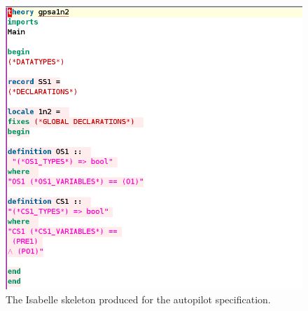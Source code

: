 \begin{figure}[H]
\centering
\begin{minipage}{0.45\textwidth}
\centering
\includegraphics[clip, trim=0cm 0cm 15cm 0cm, scale=0.5]{examples/semiform/4image.png}
\vspace{-0.18in}
\caption{The Isabelle skeleton produced for the autopilot specification. \label{fig:autoisskel}}
\vspace{-0.2in}
\end{minipage}\hfill
\begin{minipage}{0.43\textwidth}
\centering

\end{minipage}
\end{figure}
